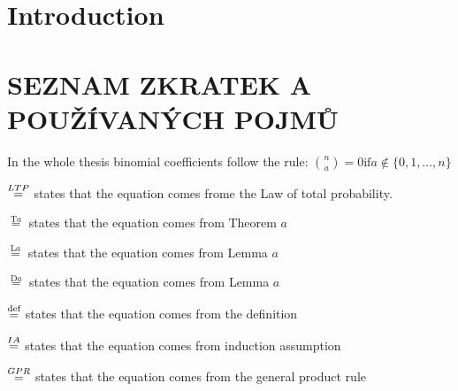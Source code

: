 \chapter*{Introduction}
\chapter*{SEZNAM ZKRATEK A POUŽÍVANÝCH POJMŮ}
In the whole thesis binomial coefficients follow the rule: $\binom{n}{a}=0 \text{if} a\not\in \{0,1,\ldots, n\}$

$\overset{LTP}{=}$ states that the equation comes frome the Law of total probability.

$\overset{\text{T}a}{=}$ states that the equation comes from Theorem $a$

$\overset{\text{L}a}{=}$ states that the equation comes from Lemma $a$

$\overset{\text{D}a}{=}$ states that the equation comes from Lemma $a$

$\overset{\text{def}}{=}$ states that the equation comes from the definition

$\overset{IA}{=}$ states that the equation comes from induction assumption

$\overset{GPR}{=}$ states that the equation comes from the general product rule
